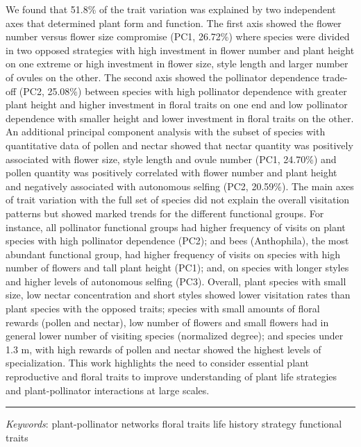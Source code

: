 \documentclass[11pt,a4paper,]{article}
\begin{document}
We found that 51.8\% of the trait variation was explained by two
independent axes that determined plant form and function. The first axis
showed the flower number versus flower size compromise (PC1, 26.72\%)
where species were divided in two opposed strategies with high
investment in flower number and plant height on one extreme or high
investment in flower size, style length and larger number of ovules on
the other. The second axis showed the pollinator dependence trade-off
(PC2, 25.08\%) between species with high pollinator dependence with
greater plant height and higher investment in floral traits on one end
and low pollinator dependence with smaller height and lower investment
in floral traits on the other. An additional principal component
analysis with the subset of species with quantitative data of pollen and
nectar showed that nectar quantity was positively associated with flower
size, style length and ovule number (PC1, 24.70\%) and pollen quantity
was positively correlated with flower number and plant height and
negatively associated with autonomous selfing (PC2, 20.59\%). The main
axes of trait variation with the full set of species did not explain the
overall visitation patterns but showed marked trends for the different
functional groups. For instance, all pollinator functional groups had
higher frequency of visits on plant species with high pollinator
dependence (PC2); and bees (Anthophila), the most abundant functional
group, had higher frequency of visits on species with high number of
flowers and tall plant height (PC1); and, on species with longer styles
and higher levels of autonomous selfing (PC3). Overall, plant species
with small size, low nectar concentration and short styles showed lower
visitation rates than plant species with the opposed traits; species
with small amounts of floral rewards (pollen and nectar), low number of
flowers and small flowers had in general lower number of visiting
species (normalized degree); and species under 1.3 m, with high rewards
of pollen and nectar showed the highest levels of specialization. This
work highlights the need to consider essential plant reproductive and
floral traits to improve understanding of plant life strategies and
plant-pollinator interactions at large scales.

\vspace{3mm} \hrule
\vspace{5mm}

\emph{Keywords}: plant-pollinator networks \textbar{} floral traits
\textbar{} life history strategy \textbar{} functional traits
\end{document}
